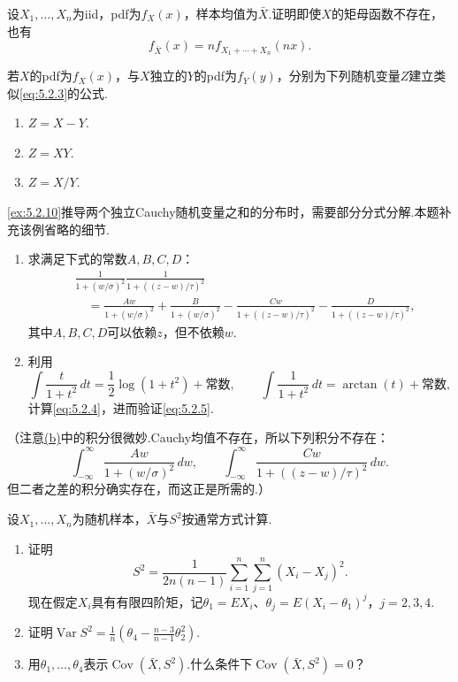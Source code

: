 \begin{exercise}\label{exercise:5.5}
设$X_1,\ldots,X_n$为iid，pdf为$f_X(x)$，样本均值为$\bar X$.证明即使$X$的矩母函数不存在，也有
$$f_{\bar X}(x)=nf_{X_1+\cdots+X_n}(nx).$$
\end{exercise}
\begin{exercise}\label{exercise:5.6}
若$X$的pdf为$f_X(x)$，与$X$独立的$Y$的pdf为$f_Y(y)$，分别为下列随机变量$Z$建立类似\eqref{eq:5.2.3}的公式.
\begin{enumerate}[label=(\alph*)]\item $Z=X-Y$.\item $Z=XY$.\item $Z=X/Y$.\end{enumerate}
\end{exercise}
\begin{exercise}\label{exercise:5.7}
\autoref{ex:5.2.10}推导两个独立Cauchy随机变量之和的分布时，需要部分分式分解.本题补充该例省略的细节.
\begin{enumerate}[label=(\alph*)]
\item 求满足下式的常数$A,B,C,D$：
$$\begin{aligned}
&\frac1{1+(w/\sigma)^2}\frac1{1+((z-w)/\tau)^2}\\
&\quad=\frac{Aw}{1+(w/\sigma)^2}+\frac B{1+(w/\sigma)^2}-\frac{Cw}{1+((z-w)/\tau)^2}-\frac D{1+((z-w)/\tau)^2},
\end{aligned}$$
其中$A,B,C,D$可以依赖$z$，但不依赖$w$.
\item{}\label{itm:exercise:5.7:b} 利用
$$\int\frac t{1+t^2}\,dt=\frac12\log(1+t^2)+\text{常数},\qquad\int\frac1{1+t^2}\,dt=\arctan(t)+\text{常数},$$
计算\eqref{eq:5.2.4}，进而验证\eqref{eq:5.2.5}.
\end{enumerate}
（注意\hyperref[itm:exercise:5.7:b]{(b)}中的积分很微妙.Cauchy均值不存在，所以下列积分不存在：
$$\int_{-\infty}^\infty\frac{Aw}{1+(w/\sigma)^2}\,dw,\qquad\int_{-\infty}^\infty\frac{Cw}{1+((z-w)/\tau)^2}\,dw.$$
但二者之差的积分确实存在，而这正是所需的.）
\end{exercise}
\begin{exercise}\label{exercise:5.8}
设$X_1,\ldots,X_n$为随机样本，$\bar X$与$S^2$按通常方式计算.
\begin{enumerate}[label=(\alph*)]
\item{}\label{item:5.8.a} 证明
$$S^2=\frac1{2n(n-1)}\sum_{i=1}^n\sum_{j=1}^n(X_i-X_j)^2.$$
现在假定$X_i$具有有限四阶矩，记$\theta_1=EX_i$、$\theta_j=E(X_i-\theta_1)^j$，$j=2,3,4$.
\item{}\label{item:5.8.b} 证明$\operatorname{Var}S^2=\frac1n(\theta_4-\frac{n-3}{n-1}\theta_2^2)$.
\item 用$\theta_1,\ldots,\theta_4$表示$\operatorname{Cov}(\bar X,S^2)$.什么条件下$\operatorname{Cov}(\bar X,S^2)=0$？
\end{enumerate}
\end{exercise}
